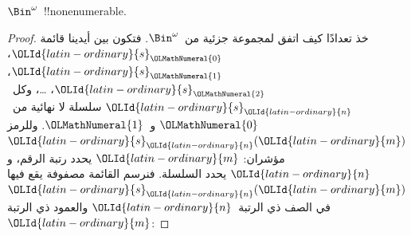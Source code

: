 \documentclass[../../../include/open-logic-section]{subfiles}
\begin{document}
\begin{thm}
$\Bin^\omega$~!!{nonenumerable}.
\end{thm}

\begin{proof}
خذ تعدادًا كيف اتفق لمجموعة جزئية من~$\Bin^\omega$. فتكون بين أيدينا قائمة ${\OLId{latin-ordinary}{s}}_{{\OLMathNumeral{0}}}$، ${\OLId{latin-ordinary}{s}}_{{\OLMathNumeral{1}}}$، ${\OLId{latin-ordinary}{s}}_{{\OLMathNumeral{2}}}$، \dots{}، وكل~${\OLId{latin-ordinary}{s}}_{\OLId{latin-ordinary}{n}}$ سلسلة لا نهائية من~${\OLMathNumeral{0}}$ و~${\OLMathNumeral{1}}$. وللرمز ${\OLId{latin-ordinary}{s}}_{\OLId{latin-ordinary}{n}}({\OLId{latin-ordinary}{m}})$ مؤشران: ${\OLId{latin-ordinary}{m}}$ يحدد رتبة الرقم، و${\OLId{latin-ordinary}{n}}$ يحدد السلسلة. فنرسم القائمة مصفوفة يقع فيها ${\OLId{latin-ordinary}{s}}_{\OLId{latin-ordinary}{n}}({\OLId{latin-ordinary}{m}})$ في الصف ذي الرتبة~${\OLId{latin-ordinary}{n}}$ والعمود ذي الرتبة~${\OLId{latin-ordinary}{m}}$:


\end{proof}
\end{document}

